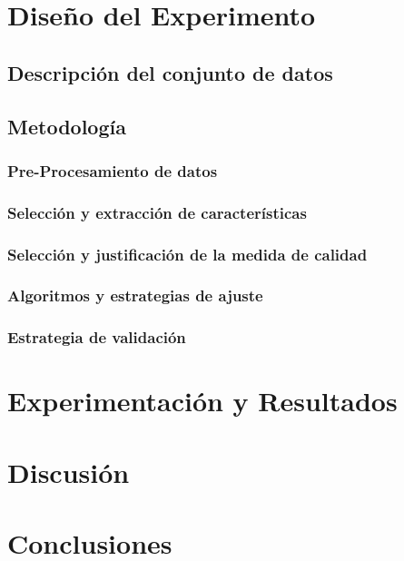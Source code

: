 \documentclass[conference]{IEEEtran}
\begin{document}
\section{Diseño del Experimento}


\subsection{Descripción del conjunto de datos}


\subsection{Metodología}


\subsubsection{Pre-Procesamiento de datos}


\subsubsection{Selección y extracción de características}


\subsubsection{Selección y justificación de la medida de calidad}


\subsubsection{Algoritmos y estrategias de ajuste}


\subsubsection{Estrategia de validación}

\section{Experimentación y Resultados}

\section{Discusión}

\section{Conclusiones}
\end{document}
